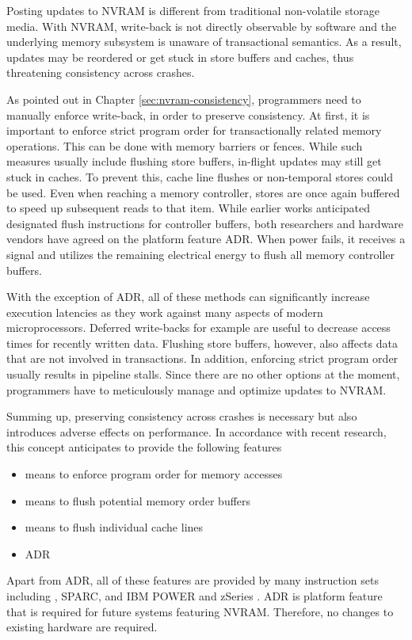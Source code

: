 Posting updates to NVRAM is different from traditional non-volatile storage
media. With NVRAM, write-back is not directly observable by software and the
underlying memory subsystem is unaware of transactional semantics. As a result,
updates may be reordered or get stuck in store buffers and caches, thus
threatening consistency across crashes.

As pointed out in Chapter \ref{sec:nvram-consistency}, programmers need to
manually enforce write-back, in order to preserve consistency. At first, it is
important to enforce strict program order for transactionally related memory
operations. This can be done with memory barriers or fences. While such measures
usually include flushing store buffers, in-flight updates may still get stuck in
caches. To prevent this, cache line flushes or non-temporal stores could be
used. Even when reaching a memory controller, stores are once again buffered to
speed up subsequent reads to that item. While earlier works anticipated
designated flush instructions for controller buffers, both researchers and
hardware vendors have agreed on the platform feature ADR. When power fails, it
receives a signal and utilizes the remaining electrical energy to flush all
memory controller buffers.

With the exception of ADR, all of these methods can significantly increase
execution latencies as they work against many aspects of modern microprocessors.
Deferred write-backs for example are useful to decrease access times for
recently written data. Flushing store buffers, however, also affects data that
are not involved in transactions. In addition, enforcing strict program order
usually results in pipeline stalls. Since there are no other options at the
moment, programmers have to meticulously manage and optimize updates to NVRAM.

Summing up, preserving consistency across crashes is necessary but also
introduces adverse effects on performance. In accordance with recent research,
this concept anticipates to provide the following features

\begin{itemize}
    \item means to enforce program order for memory accesses
    \item means to flush potential memory order buffers
    \item means to flush individual cache lines
    \item ADR
\end{itemize}

Apart from ADR, all of these features are provided by many instruction sets
including , SPARC, and IBM POWER and zSeries
\cite{mckenney2007memory}. ADR is platform feature that is required for future
systems featuring NVRAM. Therefore, no changes to existing hardware are
required.
